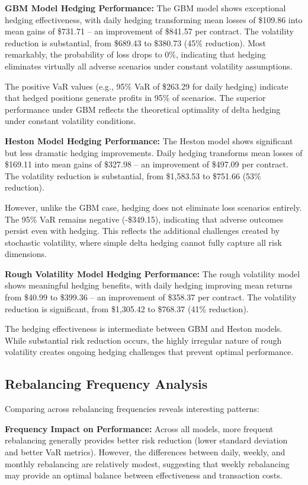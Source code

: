 \documentclass[12pt,a4paper]{report}
\begin{document}
\textbf{GBM Model Hedging Performance:}
The GBM model shows exceptional hedging effectiveness, with daily hedging transforming mean losses of \$109.86 into mean gains of \$731.71 – an improvement of \$841.57 per contract. The volatility reduction is substantial, from \$689.43 to \$380.73 (45\% reduction). Most remarkably, the probability of loss drops to 0\%, indicating that hedging eliminates virtually all adverse scenarios under constant volatility assumptions.

The positive VaR values (e.g., 95\% VaR of \$263.29 for daily hedging) indicate that hedged positions generate profits in 95\% of scenarios. The superior performance under GBM reflects the theoretical optimality of delta hedging under constant volatility conditions.

\textbf{Heston Model Hedging Performance:}
The Heston model shows significant but less dramatic hedging improvements. Daily hedging transforms mean losses of \$169.11 into mean gains of \$327.98 – an improvement of \$497.09 per contract. The volatility reduction is substantial, from \$1,583.53 to \$751.66 (53\% reduction).

However, unlike the GBM case, hedging does not eliminate loss scenarios entirely. The 95\% VaR remains negative (-\$349.15), indicating that adverse outcomes persist even with hedging. This reflects the additional challenges created by stochastic volatility, where simple delta hedging cannot fully capture all risk dimensions.

\textbf{Rough Volatility Model Hedging Performance:}
The rough volatility model shows meaningful hedging benefits, with daily hedging improving mean returns from \$40.99 to \$399.36 – an improvement of \$358.37 per contract. The volatility reduction is significant, from \$1,305.42 to \$768.37 (41\% reduction).

The hedging effectiveness is intermediate between GBM and Heston models. While substantial risk reduction occurs, the highly irregular nature of rough volatility creates ongoing hedging challenges that prevent optimal performance.

\subsection{Rebalancing Frequency Analysis}

Comparing across rebalancing frequencies reveals interesting patterns:

\textbf{Frequency Impact on Performance:}
Across all models, more frequent rebalancing generally provides better risk reduction (lower standard deviation and better VaR metrics). However, the differences between daily, weekly, and monthly rebalancing are relatively modest, suggesting that weekly rebalancing may provide an optimal balance between effectiveness and transaction costs.
\end{document}
